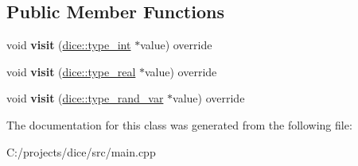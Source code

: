 \subsection*{Public Member Functions}
\begin{DoxyCompactItemize}
\item 
\mbox{\label{classformatting__visitor_a12ae5e283e6bcfd8e065ff0dac3855d1}} 
void {\bfseries visit} (\mbox{\hyperlink{classdice_1_1typed__value}{dice\+::type\+\_\+int}} $\ast$value) override
\item 
\mbox{\label{classformatting__visitor_a03c54a2e80425c1d484fdce7c6654015}} 
void {\bfseries visit} (\mbox{\hyperlink{classdice_1_1typed__value}{dice\+::type\+\_\+real}} $\ast$value) override
\item 
\mbox{\label{classformatting__visitor_a76ba84428d8e146bfd501b5bb569a770}} 
void {\bfseries visit} (\mbox{\hyperlink{classdice_1_1typed__value}{dice\+::type\+\_\+rand\+\_\+var}} $\ast$value) override
\end{DoxyCompactItemize}


The documentation for this class was generated from the following file\+:\begin{DoxyCompactItemize}
\item 
C\+:/projects/dice/src/main.\+cpp\end{DoxyCompactItemize}

